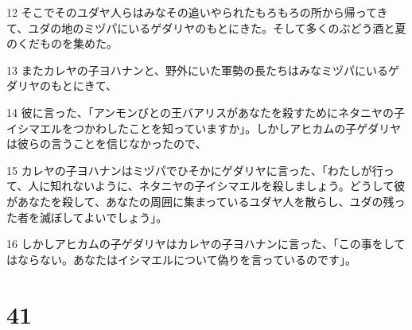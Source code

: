 \par 12 そこでそのユダヤ人らはみなその追いやられたもろもろの所から帰ってきて、ユダの地のミヅパにいるゲダリヤのもとにきた。そして多くのぶどう酒と夏のくだものを集めた。
\par 13 またカレヤの子ヨハナンと、野外にいた軍勢の長たちはみなミヅパにいるゲダリヤのもとにきて、
\par 14 彼に言った、「アンモンびとの王バアリスがあなたを殺すためにネタニヤの子イシマエルをつかわしたことを知っていますか」。しかしアヒカムの子ゲダリヤは彼らの言うことを信じなかったので、
\par 15 カレヤの子ヨハナンはミヅパでひそかにゲダリヤに言った、「わたしが行って、人に知れないように、ネタニヤの子イシマエルを殺しましょう。どうして彼があなたを殺して、あなたの周囲に集まっているユダヤ人を散らし、ユダの残った者を滅ぼしてよいでしょう」。
\par 16 しかしアヒカムの子ゲダリヤはカレヤの子ヨハナンに言った、「この事をしてはならない。あなたはイシマエルについて偽りを言っているのです」。

\chapter{41}

